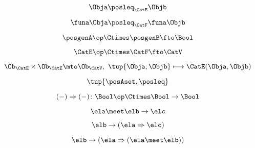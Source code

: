 {\begin{forslides}
        \begin{equation}
            \label{eq:slides_enrichment_52}
            \Obja \posleq_{\CatE} \Objb
        \end{equation}

        \begin{equation}
            \label{eq:slides_enrichment_53}
            \funa \Obja \posleq_{\CatF} \funa \Objb
        \end{equation}

        \begin{equation}
            \label{eq:slides_enrichment_54}
            \posgenA\op \Ctimes \posgenB \fto \Bool
        \end{equation}

        \begin{equation}
            \label{eq:slides_enrichment_55}
            \CatE\op \Ctimes \CatF \fto \CatV
        \end{equation}

        \begin{equation}
            \label{eq:slides_enrichment_56}
            \Ob_\CatE \times \Ob_\CatE \mto \Ob_\CatV, \ \tup{\Obja, \Objb} \longmapsto \CatE(\Obja, \Objb)
        \end{equation}

        \begin{equation}
            \label{eq:slides_enrichment_57}
            \tup{\posAset, \posleq}
        \end{equation}

        \begin{equation}
            \label{eq:slides_enrichment_58}
            ( - ) \Rightarrow ( - ) \colon \Bool\op \Ctimes \Bool \to \Bool
        \end{equation}

        \begin{equation}
            \label{eq:slides_enrichment_59}
            \ela \meet \elb \rightarrow \elc
        \end{equation}

        \begin{equation}
            \label{eq:slides_enrichment_60}
            \elb \rightarrow (\ela \Rightarrow \elc)
        \end{equation}

        \begin{equation}
            \label{eq:slides_enrichment_61}
            \elb \rightarrow (\ela \Rightarrow (\ela \meet \elb))
        \end{equation}


\end{forslides}}
